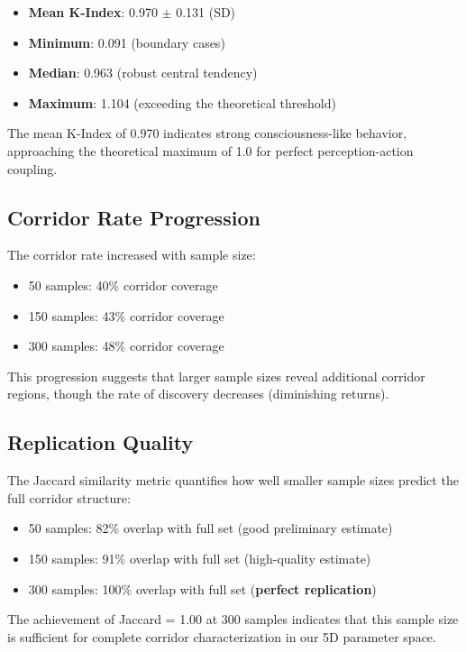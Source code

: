 \documentclass[10pt,letterpaper]{article}
\begin{document}
\begin{itemize}
    \item \textbf{Mean K-Index}: 0.970 $\pm$ 0.131 (SD)
    \item \textbf{Minimum}: 0.091 (boundary cases)
    \item \textbf{Median}: 0.963 (robust central tendency)
    \item \textbf{Maximum}: 1.104 (exceeding the theoretical threshold)
\end{itemize}

The mean K-Index of 0.970 indicates strong consciousness-like behavior, approaching the theoretical maximum of 1.0 for perfect perception-action coupling.

\subsection*{Corridor Rate Progression}

The corridor rate increased with sample size:
\begin{itemize}
    \item 50 samples: 40\% corridor coverage
    \item 150 samples: 43\% corridor coverage
    \item 300 samples: 48\% corridor coverage
\end{itemize}

This progression suggests that larger sample sizes reveal additional corridor regions, though the rate of discovery decreases (diminishing returns).

\subsection*{Replication Quality}

The Jaccard similarity metric quantifies how well smaller sample sizes predict the full corridor structure:

\begin{itemize}
    \item 50 samples: 82\% overlap with full set (good preliminary estimate)
    \item 150 samples: 91\% overlap with full set (high-quality estimate)
    \item 300 samples: 100\% overlap with full set (\textbf{perfect replication})
\end{itemize}

The achievement of Jaccard = 1.00 at 300 samples indicates that this sample size is sufficient for complete corridor characterization in our 5D parameter space.
\end{document}
